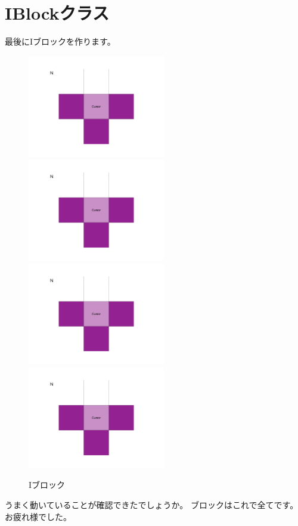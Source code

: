 \section{IBlockクラス}
最後にIブロックを作ります。
\begin{figure}[h]
  \includegraphics[width=60mm, page=21]{images/Blocks.pdf}
  \includegraphics[width=60mm, page=22]{images/Blocks.pdf}
  \includegraphics[width=60mm, page=23]{images/Blocks.pdf}
  \includegraphics[width=60mm, page=24]{images/Blocks.pdf}
  \caption{Iブロック}
\end{figure}
うまく動いていることが確認できたでしょうか。
ブロックはこれで全てです。お疲れ様でした。
